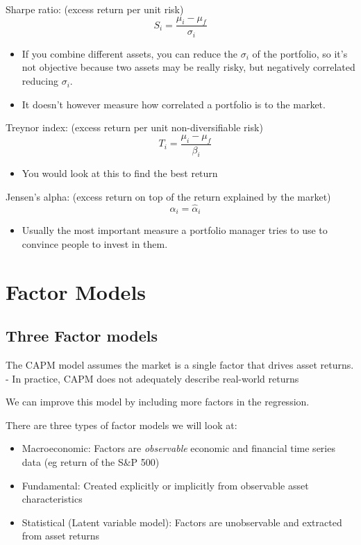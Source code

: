 \documentclass[
  oneside]{book}
\providecommand{\tightlist}{%
  \setlength{\itemsep}{0pt}\setlength{\parskip}{0pt}}
\begin{document}
Sharpe ratio: (excess return per unit risk)
\[
S_i=\frac{\mu_i-\mu_f}{\sigma_i}
\]

\begin{itemize}
\tightlist
\item
  If you combine different assets, you can reduce the \(\sigma_{i}\) of the portfolio, so it's not objective because two assets may be really risky, but negatively correlated reducing \(\sigma_{i}\).
\item
  It doesn't however measure how correlated a portfolio is to the market.
\end{itemize}

Treynor index: (excess return per unit non-diversifiable risk)
\[
\quad T_i=\frac{\mu_i-\mu_f}{\beta_i}
\]

\begin{itemize}
\tightlist
\item
  You would look at this to find the best return
\end{itemize}

Jensen's alpha: (excess return on top of the return explained by the market)
\[
\quad \alpha_i=\hat{\alpha}_i
\]

\begin{itemize}
\tightlist
\item
  Usually the most important measure a portfolio manager tries to use to convince people to invest in them.
\end{itemize}

\hypertarget{factor-models}{%
\chapter{Factor Models}\label{factor-models}}

\hypertarget{three-factor-models}{%
\section{Three Factor models}\label{three-factor-models}}

The CAPM model assumes the market is a single factor that drives asset returns.
- In practice, CAPM does not adequately describe real-world returns

We can improve this model by including more factors in the regression.

There are three types of factor models we will look at:

\begin{itemize}
\tightlist
\item
  Macroeconomic: Factors are \emph{observable} economic and financial time series data (eg return of the S\&P 500)
\item
  Fundamental: Created explicitly or implicitly from observable asset characteristics
\item
  Statistical (Latent variable model): Factors are unobservable and extracted from asset returns
\end{itemize}
\end{document}
